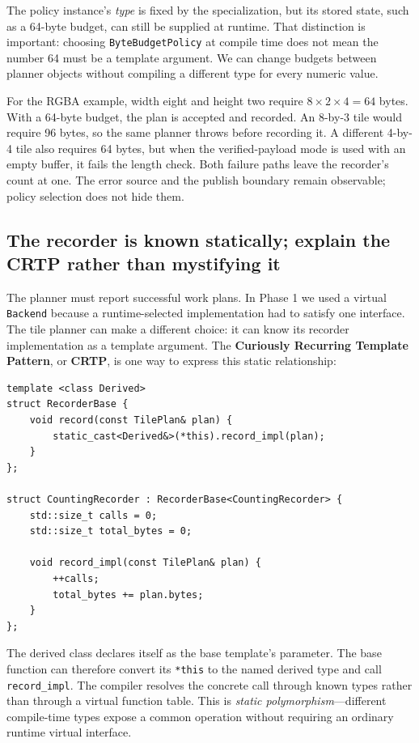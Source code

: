 The policy instance's \emph{type} is fixed by the specialization, but its stored state, such as a 64-byte budget, can still be supplied at runtime. That distinction is important: choosing \texttt{ByteBudgetPolicy} at compile time does not mean the number 64 must be a template argument. We can change budgets between planner objects without compiling a different type for every numeric value.

For the RGBA example, width eight and height two require \(8\times2\times4=64\) bytes. With a 64-byte budget, the plan is accepted and recorded. An 8-by-3 tile would require 96 bytes, so the same planner throws before recording it. A different 4-by-4 tile also requires 64 bytes, but when the verified-payload mode is used with an empty buffer, it fails the length check. Both failure paths leave the recorder's count at one. The error source and the publish boundary remain observable; policy selection does not hide them.

\subsection{The recorder is known statically; explain the CRTP rather than mystifying it}\label{01-foundations-i-ch005-the-recorder-is-known-statically-explain-the-crtp-rather-than-mystifying-it}

The planner must report successful work plans. In Phase 1 we used a virtual \texttt{Backend} because a runtime-selected implementation had to satisfy one interface. The tile planner can make a different choice: it can know its recorder implementation as a template argument. The \textbf{Curiously Recurring Template Pattern}, or \textbf{CRTP}, is one way to express this static relationship:

\begin{verbatim}
template <class Derived>
struct RecorderBase {
    void record(const TilePlan& plan) {
        static_cast<Derived&>(*this).record_impl(plan);
    }
};

struct CountingRecorder : RecorderBase<CountingRecorder> {
    std::size_t calls = 0;
    std::size_t total_bytes = 0;

    void record_impl(const TilePlan& plan) {
        ++calls;
        total_bytes += plan.bytes;
    }
};
\end{verbatim}

The derived class declares itself as the base template's parameter. The base function can therefore convert its \texttt{*this} to the named derived type and call \texttt{record\_impl}. The compiler resolves the concrete call through known types rather than through a virtual function table. This is \emph{static polymorphism}---different compile-time types expose a common operation without requiring an ordinary runtime virtual interface.

